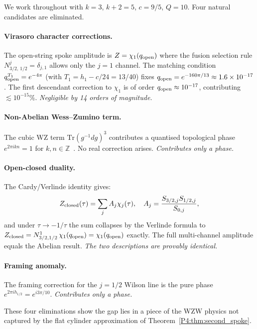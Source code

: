 \documentclass[11pt,a4paper]{article}
\theoremstyle{definition}
\theoremstyle{remark}
\begin{document}
We work throughout with $k=3$, $k+2=5$, $c=9/5$, $Q=10$.
Four natural candidates are eliminated.

\paragraph{Virasoro character corrections.}
The open-string spoke amplitude is $Z = \chi_1(q_{\rm open})$ where the
fusion selection rule $N_{3/2,\,1/2}^j=\delta_{j,1}$ allows only the $j=1$
channel.
The matching condition $q_{\rm open}^{T_1}=e^{-4\pi}$ (with $T_1=h_1-c/24=13/40$)
fixes $q_{\rm open}=e^{-160\pi/13}\approx1.6\times10^{-17}$.
The first descendant correction to $\chi_1$ is of order $q_{\rm open}\approx10^{-17}$,
contributing $\lesssim10^{-15}\%$.
\emph{Negligible by 14 orders of magnitude.}

\paragraph{Non-Abelian Wess--Zumino term.}
The cubic WZ term $\mathrm{Tr}(g^{-1}dg)^3$ contributes a quantised topological
phase $e^{2\pi ikn}=1$ for $k,n\in\mathbb{Z}$~\cite{Witten1984}.
No real correction arises.
\emph{Contributes only a phase.}

\paragraph{Open-closed duality.}
The Cardy/Verlinde identity gives:
\begin{equation}
  Z_{\rm closed}(\tau)
  = \sum_j A_j\chi_j(\tau),\quad
  A_j = \frac{S_{3/2,j}S_{1/2,j}}{S_{0,j}},
  \label{P4:eq:Zclosed}
\end{equation}
and under $\tau\to-1/\tau$ the sum collapses by the Verlinde formula to
$Z_{\rm closed} = N_{3/2,1/2}^1\,\chi_1(q_{\rm open}) = \chi_1(q_{\rm open})$
exactly.  The full multi-channel amplitude equals the Abelian result.
\emph{The two descriptions are provably identical.}

\paragraph{Framing anomaly.}
The framing correction for the $j=1/2$ Wilson line is the pure phase
$e^{2\pi i h_{1/2}}=e^{i3\pi/10}$.
\emph{Contributes only a phase.}

These four eliminations show the gap lies in a piece of the WZW physics
not captured by the flat cylinder approximation of Theorem~\ref{P4:thm:second_spoke}.
\end{document}
